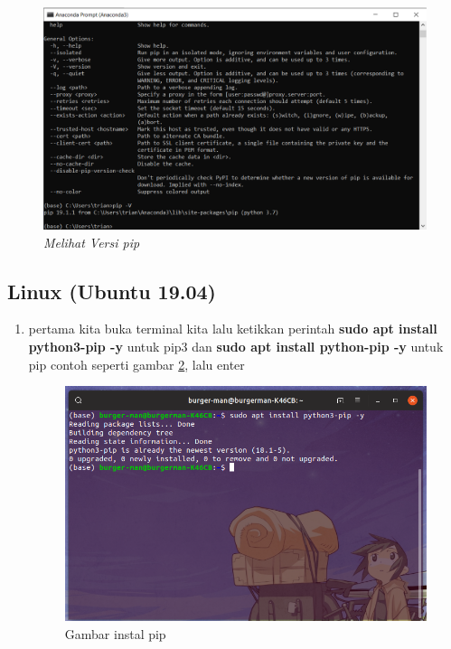 \begin{enumerate}
\begin{figure}[H]
    \centering
    \includegraphics[scale=0.5]{figures/pipversion}
    \caption{\textit{Melihat Versi pip}}
    \label{Figureanaconda70}
\end{figure}

\end{enumerate}

\subsection{Linux (Ubuntu 19.04)}
\begin{enumerate}

\item pertama kita buka terminal kita lalu ketikkan perintah \textbf{sudo apt install python3-pip -y} untuk pip3 dan \textbf{sudo apt install python-pip -y} untuk pip contoh seperti gambar \ref{installpip}, lalu enter
\begin{figure}[H]
\centering
\includegraphics[width=1\textwidth]{figures/installpip.png}
\caption{Gambar instal pip}
\label{installpip}
\end{figure}

\end{enumerate}

